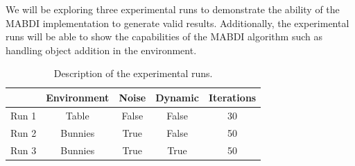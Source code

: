 We will be exploring three experimental runs to demonstrate the
ability of the MABDI implementation to generate valid results. Additionally, the
experimental runs will be able to show the capabilities of the MABDI algorithm
such as handling object addition in the environment.

\begin{table}[h]
  \caption{Description of the experimental runs.}
  \label{tab:run}
  \begin{footnotesize}
  \begin{center}
    \begin{tabular}{|l|c|c|c|c|}
    \hline
           & Environment & Noise   & Dynamic & Iterations \\\hline
    Run 1	 & Table       & False   & False   & 30 \\
    Run 2  & Bunnies     & True    & False   & 50 \\
    Run 3  & Bunnies     & True    & True    & 50 \\
    \hline
    \end{tabular}
  \end{center}
  \end{footnotesize}
\end{table}
